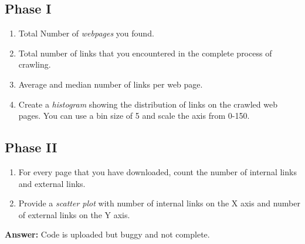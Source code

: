 \documentclass{WeSTassignment}
\begin{document}
\subsection{Phase I}
\begin{enumerate}
\item Total Number of \emph{webpages} you found.
\item Total number of links that you encountered in the complete process of crawling.
\item Average and median number of links per web page.
\item Create a \emph{histogram} showing the distribution of links on the crawled web pages. You can use a bin size of 5 and scale the axis from 0-150.
\end{enumerate}

\subsection{Phase II}
\begin{enumerate}
\item For every page that you have downloaded, count the number of internal links and external links. 
\item Provide a \emph{scatter plot} with number of internal links on the X axis and number of external links on the Y axis.
\end{enumerate}


\textbf{Answer:} Code is uploaded but buggy and not complete.





\makefooter
\end{document}
